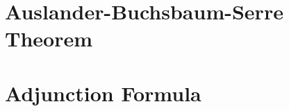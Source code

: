 \maketitle


\section{Auslander-Buchsbaum-Serre Theorem}



\section{Adjunction Formula}


%
%
%
%
%
%
%
%
%
%
%
%
%
%
%
%
%
%
%

